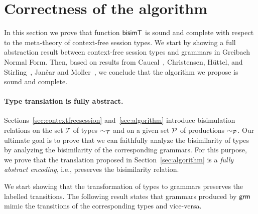 \section{Correctness of the algorithm}
\label{sec:correctness}

In this section we prove that function $\mathsf{bisimT}$ is sound and complete
with respect to the meta-theory of context-free session types.
%
We start by showing a full abstraction result between context-free
session types and grammars in Greibach Normal Form.
%
Then, based on results from Caucal~\cite{caucal1986decidabilite},
Christensen, H{\"{u}}ttel, and
Stirling~\cite{DBLP:journals/iandc/ChristensenHS95}, Jan{\v{c}}ar and
Moller~\cite{janvcar1999techniques}, we conclude that the algorithm 
we propose is sound and complete.

\paragraph{Type translation is fully abstract.}

Sections~\ref{sec:contextfreesession} and~\ref{sec:algorithm}
introduce bisimulation relations on the set $\mathcal T$ of types
$\sim_\mathcal T$ and on a given set $\mathcal P$ of productions
$\sim_\mathcal P$.  Our ultimate goal is to prove that we can faithfully
analyze the bisimilarity of types by analyzing the bisimilarity of the
corresponding grammars. For this purpose, we prove that the translation
proposed in Section~\ref{sec:algorithm} is a \emph{fully abstract
  encoding}, i.e., preserves the bisimilarity
relation. %

We start showing that the transformation of types to grammars
preserves the labelled transitions.
%
%
The following result states that grammars produced by
$\mathsf{grm}$ mimic the transitions of the corresponding types
and vice-versa.

